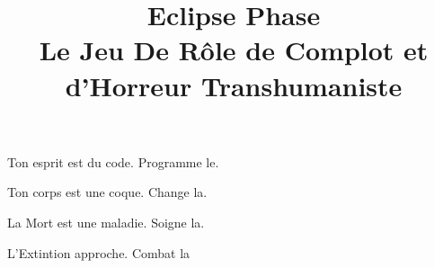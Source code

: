 \documentclass{book}
\begin{document}
 

\title{Eclipse Phase\\ Le Jeu De Rôle de Complot et d'Horreur Transhumaniste} \date{} 

\maketitle



\begin{frontmatter} 

\begin{center} Ton esprit est du code. Programme le. 

Ton corps est une coque. Change la. 

La Mort est une maladie. Soigne la. 

L'Extintion approche. Combat la \end{center} 

\newpage



 

\tableofcontents



\end{frontmatter} 

\begin{mainmatter} 

              

\end{mainmatter} 
\end{document}
